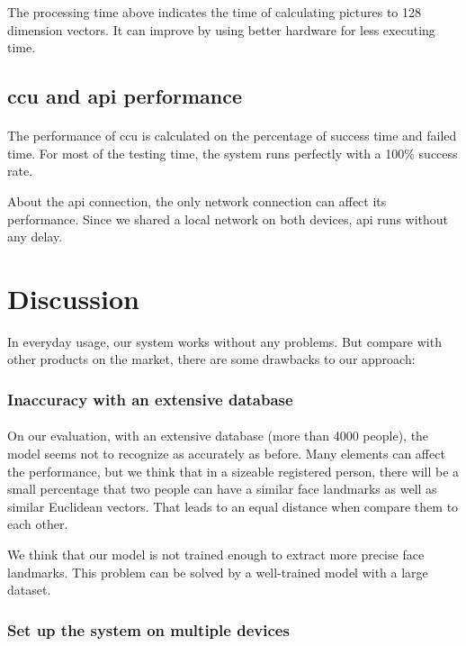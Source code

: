 The processing time above indicates the time of calculating pictures to 128 dimension vectors. It can improve by using better hardware for less executing time.

\subsection{\acrlong{ccu} and \acrshort{api} performance}
\paragraph{}
The performance of \acrshort{ccu} is calculated on the percentage of success time and failed time. For most of the testing time, the system runs perfectly with a 100\% success rate.

About the \acrshort{api} connection, the only network connection can affect its performance. Since we shared a local network on both devices, \acrshort{api} runs without any delay.

\section{Discussion}
In everyday usage, our system works without any problems. But compare with other products on the market, there are some drawbacks to our approach:
\subsubsection{Inaccuracy with an extensive database}
\paragraph{}
On our evaluation, with an extensive database (more than 4000 people), the model seems not to recognize as accurately as before. Many elements can affect the performance, but we think that in a sizeable registered person, there will be a small percentage that two people can have a similar face landmarks as well as similar Euclidean vectors. That leads to an equal distance when compare them to each other.

We think that our model is not trained enough to extract more precise face landmarks. This problem can be solved by a well-trained model with a large dataset.

\subsubsection{Set up the system on multiple devices}
